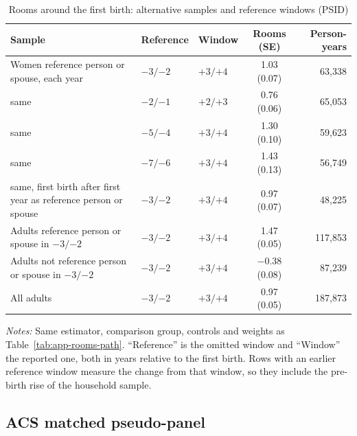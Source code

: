 \begin{table}[H]
\centering
\caption{Rooms around the first birth: alternative samples and reference windows (PSID)}
\label{tab:app-rooms-robust}
\small
\begin{tabularx}{\textwidth}{@{}X l l c r@{}}
\toprule
Sample & Reference & Window & Rooms (SE) & Person-years \\
\midrule
Women reference person or spouse, each year & $-3/{-2}$ & $+3/{+4}$ & 1.03 (0.07) & 63,338 \\
\quad same & $-2/{-1}$ & $+2/{+3}$ & 0.76 (0.06) & 65,053 \\
\quad same & $-5/{-4}$ & $+3/{+4}$ & 1.30 (0.10) & 59,623 \\
\quad same & $-7/{-6}$ & $+3/{+4}$ & 1.43 (0.13) & 56,749 \\
\quad same, first birth after first year as reference person or spouse & $-3/{-2}$ & $+3/{+4}$ & 0.97 (0.07) & 48,225 \\
\addlinespace
Adults reference person or spouse in $-3/{-2}$ & $-3/{-2}$ & $+3/{+4}$ & 1.47 (0.05) & 117,853 \\
Adults not reference person or spouse in $-3/{-2}$ & $-3/{-2}$ & $+3/{+4}$ & $-0.38$ (0.08) & 87,239 \\
All adults & $-3/{-2}$ & $+3/{+4}$ & 0.97 (0.05) & 187,873 \\
\bottomrule
\end{tabularx}
\par\smallskip
\begin{minipage}{0.97\linewidth}
\footnotesize\textit{Notes:} Same estimator, comparison group, controls and
weights as Table~\ref{tab:app-rooms-path}. ``Reference'' is the omitted window
and ``Window'' the reported one, both in years relative to the first birth.
Rows with an earlier reference window measure the change from that window, so
they include the pre-birth rise of the household sample.
\end{minipage}
\end{table}

\subsection{ACS matched pseudo-panel}

